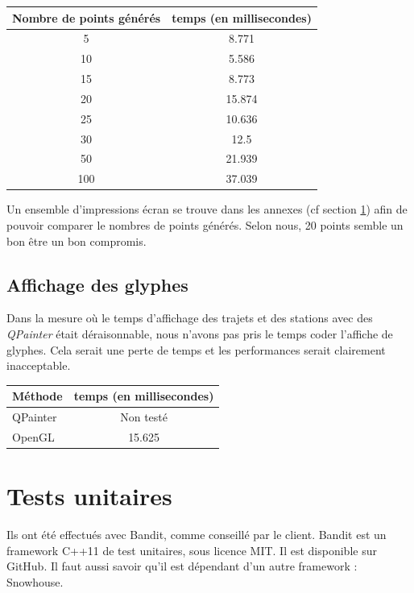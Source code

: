 \documentclass[12pt]{article}
\begin{document}
		\begin{center}
			\begin{tabular}{| c | c |}
			\hline
			\textbf{Nombre de points générés} & \textbf{temps (en millisecondes)}\\ \hline
			5  &  8.771 \\ \hline
			10 &  5.586 \\ \hline
			15 &  8.773 \\ \hline
			20 &  15.874 \\ \hline
			25 &  10.636 \\ \hline
			30 &  12.5 \\ \hline
			50 &  21.939\\ \hline
			100 &  37.039 \\ \hline
		    \end{tabular}
	    \end{center}
	    
	    Un ensemble d'impressions écran se trouve dans les annexes (cf section \ref{}) afin
	    de pouvoir comparer le nombres de points générés. Selon nous, 20 points semble un bon être
	    un bon compromis.\\
	    
		\subsection{Affichage des glyphes}
		Dans la mesure où le temps d'affichage des trajets et des stations avec des \textit{QPainter}
		était déraisonnable, nous n'avons pas pris le temps coder l'affiche de glyphes. Cela serait 
		une perte de temps et les performances serait clairement inacceptable.
		
		\begin{center}
			\begin{tabular}{| l | c |}
			\hline
			\textbf{Méthode} & \textbf{temps (en millisecondes)} \\ \hline
			QPainter & Non testé\\ \hline
			OpenGL & 15.625 \\ \hline
		    \end{tabular}
	    \end{center}
		
	\newpage
	\section{Tests unitaires}
	Ils ont été effectués avec Bandit, comme conseillé par le client.
	Bandit est un framework C++11 de test unitaires, sous licence MIT. Il est disponible sur GitHub. 		Il faut aussi savoir qu’il est dépendant d’un autre framework : Snowhouse.\\
\end{document}
